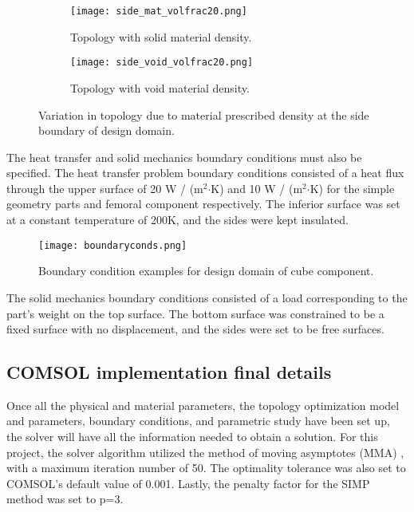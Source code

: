 \documentclass[../main.tex]{subfiles}
\begin{document}
\begin{figure}
  \begin{subfigure}{0.45\textwidth}
    \texttt{[image: side\_mat\_volfrac20.png]}
    \caption{Topology with solid material density.}
    \label{fig:solid}
  \end{subfigure}
  \begin{subfigure}{0.45\textwidth}
    \texttt{[image: side\_void\_volfrac20.png]}
    \caption{Topology with void material density.}
    \label{fig:void}
  \end{subfigure}
  \caption{Variation in topology due to material prescribed density at the side boundary of design domain.}
\end{figure}

The heat transfer and solid mechanics boundary conditions must also be specified. The heat transfer problem boundary conditions consisted of a heat flux through the upper surface of 20 W / (m$^2$$\cdot$K) and 10 W / (m$^2$$\cdot$K) for the simple geometry parts and femoral component respectively. The inferior surface was set at a constant temperature of 200\degree K, and the sides were kept insulated.

\begin{figure}[h!]
  \centering
  \texttt{[image: boundaryconds.png]}
  \caption{Boundary condition examples for design domain of cube component.}
\end{figure}

The solid mechanics boundary conditions consisted of a load corresponding to the part's weight on the top surface. The bottom surface was constrained to be a fixed surface with no displacement, and the sides were set to be free surfaces.

\subsection{COMSOL implementation final details}

Once all the physical and material parameters, the topology optimization model and parameters, boundary conditions, and parametric study have been set up, the solver will have all the information needed to obtain a solution. For this project, the solver algorithm utilized the method of moving asymptotes (MMA) \cite{svanbergMethodMovingAsymptotes1987}, with a maximum iteration number of 50. The optimality tolerance was also set to COMSOL's default value of 0.001. Lastly, the penalty factor for the SIMP method was set to p=3.
\end{document}
